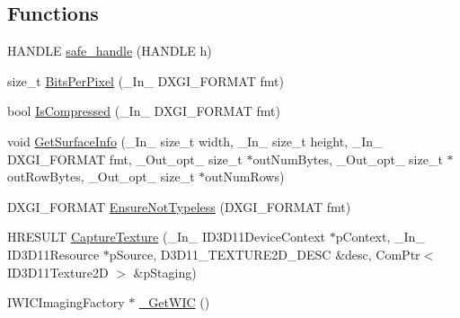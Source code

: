 \subsection*{Functions}
\begin{DoxyCompactItemize}
\item 
H\+A\+N\+D\+LE \mbox{\hyperlink{namespaceanonymous__namespace_02screen__grab_8cpp_03_ad85a0a1b992cc9fc695c7a5d0a3a0500}{safe\+\_\+handle}} (H\+A\+N\+D\+LE h)
\item 
size\+\_\+t \mbox{\hyperlink{namespaceanonymous__namespace_02screen__grab_8cpp_03_a1237e85d6137361bff996e57731a4084}{Bits\+Per\+Pixel}} (\+\_\+\+In\+\_\+ D\+X\+G\+I\+\_\+\+F\+O\+R\+M\+AT fmt)
\item 
bool \mbox{\hyperlink{namespaceanonymous__namespace_02screen__grab_8cpp_03_a9cdc4b241b8e5ff146cd14e9c46a4036}{Is\+Compressed}} (\+\_\+\+In\+\_\+ D\+X\+G\+I\+\_\+\+F\+O\+R\+M\+AT fmt)
\item 
void \mbox{\hyperlink{namespaceanonymous__namespace_02screen__grab_8cpp_03_af11698fdd62e0139bcfb139338639af9}{Get\+Surface\+Info}} (\+\_\+\+In\+\_\+ size\+\_\+t width, \+\_\+\+In\+\_\+ size\+\_\+t height, \+\_\+\+In\+\_\+ D\+X\+G\+I\+\_\+\+F\+O\+R\+M\+AT fmt, \+\_\+\+Out\+\_\+opt\+\_\+ size\+\_\+t $\ast$out\+Num\+Bytes, \+\_\+\+Out\+\_\+opt\+\_\+ size\+\_\+t $\ast$out\+Row\+Bytes, \+\_\+\+Out\+\_\+opt\+\_\+ size\+\_\+t $\ast$out\+Num\+Rows)
\item 
D\+X\+G\+I\+\_\+\+F\+O\+R\+M\+AT \mbox{\hyperlink{namespaceanonymous__namespace_02screen__grab_8cpp_03_ac1235884bfc8432026df8d224296aa98}{Ensure\+Not\+Typeless}} (D\+X\+G\+I\+\_\+\+F\+O\+R\+M\+AT fmt)
\item 
H\+R\+E\+S\+U\+LT \mbox{\hyperlink{namespaceanonymous__namespace_02screen__grab_8cpp_03_a65cdb5191a2bc3cc789e789320c97656}{Capture\+Texture}} (\+\_\+\+In\+\_\+ I\+D3\+D11\+Device\+Context $\ast$p\+Context, \+\_\+\+In\+\_\+ I\+D3\+D11\+Resource $\ast$p\+Source, D3\+D11\+\_\+\+T\+E\+X\+T\+U\+R\+E2\+D\+\_\+\+D\+E\+SC \&desc, Com\+Ptr$<$ I\+D3\+D11\+Texture2D $>$ \&p\+Staging)
\item 
I\+W\+I\+C\+Imaging\+Factory $\ast$ \mbox{\hyperlink{namespaceanonymous__namespace_02screen__grab_8cpp_03_a8499ec768dea9a4e1a337f2a6bb401db}{\+\_\+\+Get\+W\+IC}} ()
\end{DoxyCompactItemize}
